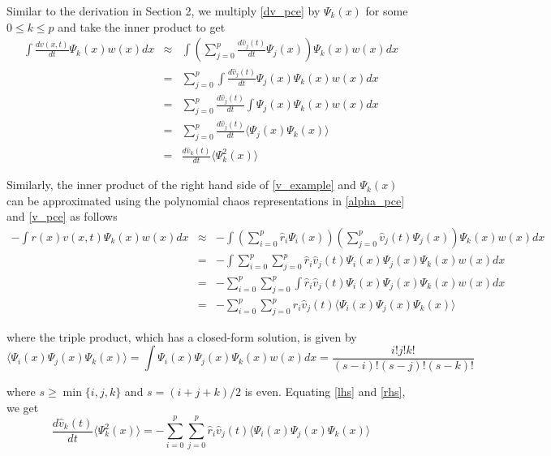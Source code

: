 \documentclass[11pt]{article}
\numberwithin{equation}{section}
\begin{document}
Similar to the derivation in Section 2, we multiply \eqref{dv_pce} by $\Psi_k(x)$ for some $0 \leq k \leq  p$ and take the inner product to get
\begin{eqnarray}
\int \frac{dv(x, t)}{dt} \Psi_k(x) w(x) dx & \approx & \int \left( \sum_{j=0}^p \frac{d\hat{v}_j(t)}{dt} \Psi_j(x) \right) \Psi_k(x) w(x) dx  \nonumber \\
& = & \sum_{j=0}^p \int \frac{d\hat{v}_j(t)}{dt} \Psi_j(x) \Psi_k(x) w(x) dx \nonumber \\
& = & \sum_{j=0}^p \frac{d\hat{v}_j(t)}{dt} \int \Psi_j(x) \Psi_k(x) w(x) dx \nonumber \\
& = & \sum_{j=0}^p \frac{d\hat{v}_j(t)}{dt} \langle \Psi_j(x) \Psi_k(x) \rangle \nonumber \\
& = & \frac{d\hat{v}_k(t)}{dt} \langle \Psi_k^2(x) \rangle \label{lhs}
\end{eqnarray}

Similarly, the inner product of the right hand side of \eqref{v_example} and $\Psi_k(x)$ can be approximated using the polynomial chaos representations in \eqref{alpha_pce} and \eqref{v_pce} as follows
\begin{eqnarray}
 - \int r(x) v(x, t) \Psi_k(x) w(x) dx & \approx & - \int \left( \sum_{i=0}^p \hat{r}_i \Psi_i(x) \right) \left( \sum_{j=0}^p \hat{v}_j(t) \Psi_j(x) \right) \Psi_k(x) w(x) dx \nonumber \\
& = & - \int \sum_{i=0}^p \sum_{j=0}^p \hat{r}_i \hat{v}_j(t) \Psi_i(x) \Psi_j(x) \Psi_k(x) w(x) dx \nonumber \\
& = & - \sum_{i=0}^p \sum_{j=0}^p \int \hat{r}_i \hat{v}_j(t) \Psi_i(x) \Psi_j(x) \Psi_k(x) w(x) dx \nonumber \\
& = & - \sum_{i=0}^p \sum_{j=0}^p \hat{r}_i \hat{v}_j(t) \langle \Psi_i(x) \Psi_j(x) \Psi_k(x) \rangle \label{rhs}
\end{eqnarray}

where the triple product, which has a closed-form solution, is given by
\begin{equation}
\langle \Psi_i(x) \Psi_j(x) \Psi_k(x) \rangle = \int \Psi_i(x) \Psi_j(x) \Psi_k(x) w(x) dx = \frac{i! j! k!}{(s-i)! (s-j)! (s-k)!}
\end{equation}
 
where $s \geq \min\{i, j, k\}$ and $s = (i + j + k)/2$ is even. Equating \eqref{lhs} and \eqref{rhs}, we get 
\begin{equation*}
\frac{d\hat{v}_k(t)}{dt} \langle \Psi_k^2(x) \rangle = - \sum_{i=0}^p \sum_{j=0}^p \hat{r}_i \hat{v}_j(t) \langle \Psi_i(x) \Psi_j(x) \Psi_k(x) \rangle
\end{equation*}
\end{document}
